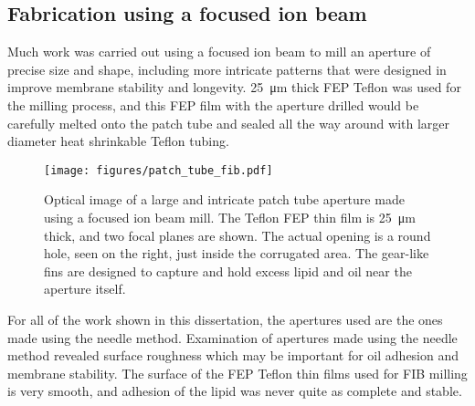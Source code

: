 \subsection{Fabrication using a focused ion beam}

Much work was carried out using a focused ion beam to mill an aperture of precise size and shape, including more intricate patterns that were designed in improve membrane stability and longevity.  \SI{25}{\um} thick FEP Teflon was used for the milling process, and this FEP film with the aperture drilled would be carefully melted onto the patch tube and sealed all the way around with larger diameter heat shrinkable Teflon tubing.

\begin{figure}[h]
\begin{centering}
\texttt{[image: figures/patch\_tube\_fib.pdf]}
\caption[Patch tube aperture milled using FIB]{Optical image of a large and intricate patch tube aperture made using a focused ion beam mill.  The Teflon FEP thin film is \SI{25}{\um} thick, and two focal planes are shown.  The actual opening is a round hole, seen on the right, just inside the corrugated area.  The gear-like fins are designed to capture and hold excess lipid and oil near the aperture itself.}
\label{fig:patch_tube_fib}
\end{centering}
\end{figure}

For all of the work shown in this dissertation, the apertures used are the ones made using the needle method.  Examination of apertures made using the needle method revealed surface roughness which may be important for oil adhesion and membrane stability.  The surface of the FEP Teflon thin films used for FIB milling is very smooth, and adhesion of the lipid was never quite as complete and stable.